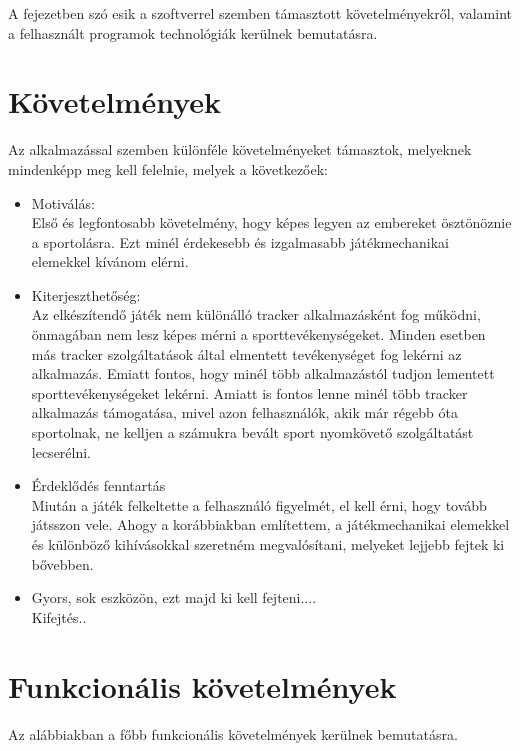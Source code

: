 
A fejezetben szó esik a szoftverrel szemben támasztott követelményekről, valamint a felhasznált programok technológiák kerülnek bemutatásra. 

\section{Követelmények}
\label{kovetelmenyek}

Az alkalmazással szemben különféle követelményeket támasztok, melyeknek mindenképp meg kell felelnie, melyek a következőek: 

\begin{itemize}
	\item Motiválás: 
	\\
	Első és legfontosabb követelmény, hogy képes legyen az embereket ösztönöznie a sportolásra. 
	Ezt minél érdekesebb és izgalmasabb játékmechanikai elemekkel kívánom elérni. 
	\item Kiterjeszthetőség: 
	\\
	Az elkészítendő játék nem különálló tracker alkalmazásként fog működni, önmagában nem lesz képes mérni a sporttevékenységeket. 
	Minden esetben más tracker szolgáltatások által elmentett tevékenységet fog lekérni az alkalmazás. 
	Emiatt fontos, hogy minél több alkalmazástól tudjon lementett sporttevékenységeket lekérni. 
	Amiatt is fontos lenne minél több tracker alkalmazás támogatása, mivel azon felhasználók, akik már régebb óta sportolnak, ne kelljen a számukra bevált sport nyomkövető szolgáltatást lecserélni. 
	\item Érdeklődés fenntartás 
	\\
	Miután a játék felkeltette a felhasználó figyelmét, el kell érni, hogy tovább játsszon vele. 
	Ahogy a korábbiakban említettem, a játékmechanikai elemekkel és különböző kihívásokkal szeretném megvalósítani, melyeket lejjebb fejtek ki bővebben. 

	\item Gyors, sok eszközön, ezt majd ki kell fejteni.... 
	\\
	Kifejtés.. 
\end{itemize}


\section*{Funkcionális követelmények}
\label{funkckovetelmenyeks}

Az alábbiakban a főbb funkcionális követelmények kerülnek bemutatásra. 

